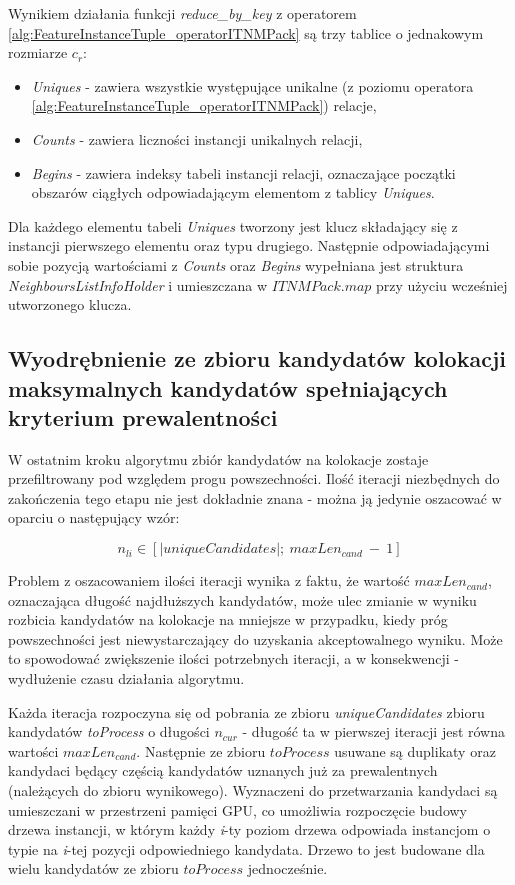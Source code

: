 \documentclass[12pt]{article}
\begin{document}
Wynikiem działania funkcji \textit{reduce\_by\_key} z operatorem \ref{alg:FeatureInstanceTuple_operatorITNMPack} są trzy tablice o jednakowym rozmiarze $ c_{r} $:
\begin{itemize}
\item \textit{Uniques} - zawiera wszystkie występujące unikalne (z poziomu operatora \ref{alg:FeatureInstanceTuple_operatorITNMPack}) relacje,
\item \textit{Counts} - zawiera liczności instancji unikalnych relacji,
\item \textit{Begins} - zawiera indeksy tabeli instancji relacji, oznaczające początki obszarów ciągłych odpowiadającym elementom z tablicy \textit{Uniques}.
\end{itemize}

Dla każdego elementu tabeli \textit{Uniques} tworzony jest klucz składający się z instancji pierwszego elementu oraz typu drugiego. Następnie odpowiadającymi sobie pozycją wartościami z \textit{Counts} oraz \textit{Begins} wypełniana jest struktura \textit{NeighboursListInfoHolder} i umieszczana w $ ITNMPack.map $ przy użyciu wcześniej utworzonego klucza. 

\subsection{Wyodrębnienie ze zbioru kandydatów kolokacji maksymalnych kandydatów spełniających kryterium prewalentności}

W ostatnim kroku algorytmu zbiór kandydatów na kolokacje zostaje przefiltrowany pod względem progu powszechności. Ilość iteracji niezbędnych do zakończenia tego etapu nie jest dokładnie znana - można ją jedynie oszacować w oparciu o następujący wzór:

\begin{equation}
n_{li} \in {[ |uniqueCandidates|;\ maxLen_{cand}\ -\ 1 ]}
\end{equation}

Problem z oszacowaniem ilości iteracji wynika z faktu, że wartość $ maxLen_{cand} $, oznaczająca długość najdłuższych kandydatów, może ulec zmianie w wyniku rozbicia kandydatów na kolokacje na mniejsze w przypadku, kiedy próg powszechności jest niewystarczający do uzyskania akceptowalnego wyniku. Może to spowodować zwiększenie ilości potrzebnych iteracji, a w konsekwencji - wydłużenie czasu działania algorytmu.

Każda iteracja rozpoczyna się od pobrania ze zbioru \textit{uniqueCandidates} zbioru kandydatów \textit{toProcess} o długości $ n_{cur} $ - długość ta w pierwszej iteracji jest równa wartości $ maxLen_{cand} $. Następnie ze zbioru $ toProcess $ usuwane są duplikaty oraz kandydaci będący częścią kandydatów uznanych już za prewalentnych (należących do zbioru wynikowego). 
Wyznaczeni do przetwarzania kandydaci są umieszczani w przestrzeni pamięci GPU, co umożliwia rozpoczęcie budowy drzewa instancji, w którym każdy \textit{i}-ty poziom drzewa odpowiada instancjom o typie na \textit{i}-tej pozycji odpowiedniego kandydata. Drzewo to jest budowane dla wielu kandydatów ze zbioru $ toProcess $ jednocześnie.
\end{document}
